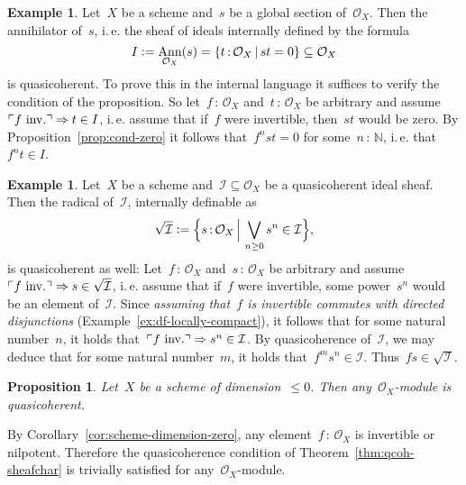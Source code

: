 \documentclass[10pt,reqno,a4paper]{amsbook}
\makeatletter
\theoremstyle{definition}
\newtheorem{ex}[defn]{Example}
\theoremstyle{plain}
\newtheorem{prop}[defn]{Proposition}
\theoremstyle{remark}
\newcommand{\A}{\mathcal{A}}
\renewcommand{\O}{\mathcal{O}}
\newcommand{\I}{\mathcal{I}}
\newcommand{\NN}{\mathbb{N}}
\DeclareMathOperator{\Ann}{Ann}
\newcommand{\?}{\,{:}\,}
\renewcommand{\_}{\mathpunct{.}\,}
\newcommand{\speak}[1]{\ulcorner\text{\textnormal{#1}}\urcorner}
\newcommand{\ie}{i.\,e.\@\xspace}
\newcommand{\inv}{inv.\@}
\newcommand{\defeq}{\vcentcolon=}
\renewenvironment{proof}[1][\proofname]{\par
  \pushQED{\qed}%
  \normalfont \topsep6\p@\@plus6\p@\relax
  \trivlist
  \item[\hskip\labelsep
        \itshape
    #1\@addpunct{.}]\ignorespaces
}{%
  \popQED\endtrivlist\@endpefalse
}
\makeatother
\begin{document}
\begin{ex}\label{ex:annihilator-qcoh}
Let~$X$ be a scheme and~$s$ be a global section of~$\O_X$. Then the
annihilator of~$s$, \ie the sheaf of ideals internally defined by the
formula
\[ I \defeq \Ann_{\O_X}(s) = \{ t\?\O_X \,|\, st = 0 \} \subseteq \O_X \]
is quasicoherent. To prove this in the internal language it suffices to
verify the condition of the proposition.
So let~$f\?\O_X$ and~$t\?\O_X$ be arbitrary and assume~$\speak{$f$ \inv} \Rightarrow t \in I$,
\ie assume that if~$f$ were invertible, then~$st$ would be zero. By
Proposition~\ref{prop:cond-zero} it follows that~$f^n st = 0$ for
some~$n\?\NN$, \ie that~$f^n t \in I$.
\end{ex}

\begin{ex}\label{ex:radical-qcoh} Let~$X$ be a scheme and~$\I \subseteq \O_X$
be a quasicoherent ideal sheaf.  Then the radical of~$\I$, internally definable
as \[ \sqrt{\I} \defeq \Bigl\{ s\?\O_X \,\Big|\, \bigvee_{n \geq 0} s^n \in \I \Bigr\}, \] is
quasicoherent as well: Let~$f\?\O_X$ and~$s\?\O_X$ be arbitrary and
assume~$\speak{$f$ \inv} \Rightarrow s \in \sqrt{\I}$, \ie assume that if~$f$
were invertible, some power~$s^n$ would be an element of~$\I$. Since
\emph{assuming that~$f$ is invertible commutes with directed disjunctions}
(Example~\ref{ex:df-locally-compact}), it follows that for some natural
number~$n$, it holds that~$\speak{$f$ \inv} \Rightarrow s^n \in \I$. By
quasicoherence of~$\I$, we may deduce that for some natural number~$m$, it
holds that~$f^m s^n \in \I$. Thus~$fs \in \sqrt{\I}$.\end{ex}


\begin{prop}Let~$X$ be a scheme of dimension~$\leq 0$. Then any~$\O_X$-module
is quasicoherent.\end{prop}
\begin{proof}By Corollary~\ref{cor:scheme-dimension-zero}, any
element~$f\?\O_X$ is invertible or nilpotent. Therefore the quasicoherence
condition of Theorem~\ref{thm:qcoh-sheafchar} is trivially satisfied for any~$\O_X$-module.
\end{proof}
\end{document}
